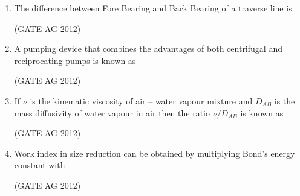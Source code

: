 \documentclass[journal]{IEEEtran}
\begin{document}
\begin{enumerate}
\item
The difference between Fore Bearing and Back Bearing of a traverse line is
\begin{enumerate}
\end{enumerate}
\hfill(GATE AG 2012)\\

\medskip

\item
A pumping device that combines the advantages of both centrifugal and reciprocating pumps is known as
\begin{enumerate}
\end{enumerate}
\hfill(GATE AG 2012)\\

\medskip

\item
If $\nu$ is the kinematic viscosity of air -- water vapour mixture and $D_{AB}$ is the mass diffusivity of water vapour in air then the ratio $\nu/D_{AB}$ is known as
\begin{enumerate}
\end{enumerate}
\hfill(GATE AG 2012)\\

\medskip

\item
Work index in size reduction can be obtained by multiplying Bond's energy constant with
\begin{enumerate}
\end{enumerate}
\hfill(GATE AG 2012)\\


\end{enumerate}
\end{document}
